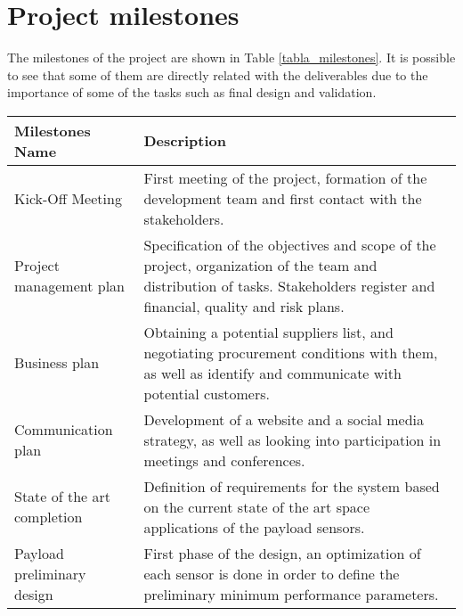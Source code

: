 \section{Project milestones}
The milestones of the project are shown in Table \ref{tabla_milestones}. It is possible to see that some of them are directly related with the deliverables due to the importance of some of the tasks such as final design and validation.
\begin{longtable}[H]{>{\raggedright\arraybackslash}p{4cm} p{10cm}}
	
	\toprule[2pt]
	
	\textbf{Milestones Name} &  \textbf{Description} \\
	
	\midrule [1.5pt]
	\endhead
	
	Kick-Off Meeting & First meeting of the project, formation of the development team and first contact with the stakeholders.\vspace{0.2cm} \\
	
	\midrule
	
	Project management plan & Specification of the objectives and scope of the project, organization of the team and distribution of tasks. Stakeholders register and financial, quality and risk plans.\vspace{0.2cm} \\
	
	\midrule
	
	Business plan & Obtaining a potential suppliers list, and negotiating procurement conditions with them, as well as identify and communicate with potential customers.\vspace{0.2cm} \\
	
	\midrule
	
	Communication plan & Development of a website and a social media strategy, as well as looking into participation in meetings and conferences.\vspace{0.2cm} \\
	
	\midrule
	
	State of the art completion & Definition of requirements for the system based on the current state of the art space applications of the payload sensors.\vspace{0.2cm} \\
	
	\midrule  
	
	Payload preliminary design & First phase of the design, an optimization of each sensor is done in order to define the preliminary minimum performance parameters.\vspace{0.2cm} \\
	

\end{longtable}
